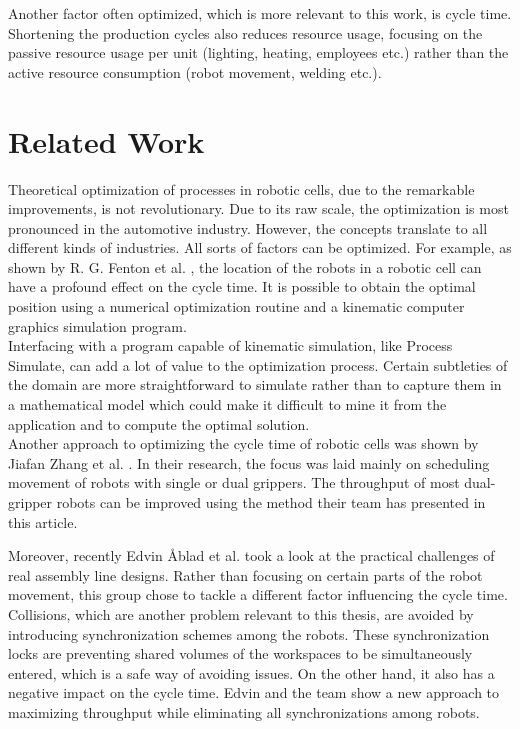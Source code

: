 Another factor often optimized, which is more relevant to this work, is cycle time. Shortening the production cycles also reduces resource usage, focusing on the passive resource usage per unit (lighting, heating, employees etc.) rather than the active resource consumption (robot movement, welding etc.). \\

\section{Related Work}

Theoretical optimization of processes in robotic cells, due to the remarkable improvements, is not revolutionary. Due to its raw scale, the optimization is most pronounced in the automotive industry. However, the concepts translate to all different kinds of industries. All sorts of factors can be optimized. For example, as shown by R. G. Fenton et al. \cite{OptimizationCycleTimeFenton}, the location of the robots in a robotic cell can have a profound effect on the cycle time. It is possible to obtain the optimal position using a numerical optimization routine and a kinematic computer graphics simulation program. \\

Interfacing with a program capable of kinematic simulation, like Process Simulate, can add a lot of value to the optimization process. Certain subtleties of the domain are more straightforward to simulate rather than to capture them in a mathematical model which could make it difficult to mine it from the application and to compute the optimal solution. \\

Another approach to optimizing the cycle time of robotic cells was shown by Jiafan Zhang et al. \cite{OptimizationCycleTimeZhang}. In their research, the focus was laid mainly on scheduling movement of robots with single or dual grippers. The throughput of most dual-gripper robots can be improved using the method their team has presented in this article. 

Moreover, recently Edvin Åblad et al. \cite{CollisionAvoidanceAblad} took a look at the practical challenges of real assembly line designs. 
Rather than focusing on certain parts of the robot movement, this group chose to tackle a different factor influencing the cycle time. Collisions, which are another problem relevant to this thesis, are avoided by introducing synchronization schemes among the robots. 
These synchronization locks are preventing shared volumes of the workspaces to be simultaneously entered, which is a safe way of avoiding issues. On the other hand, it also has a negative impact on the cycle time. Edvin and the team show a new approach to maximizing throughput while eliminating all synchronizations among robots. \\

